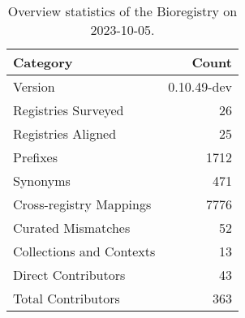 \begin{table}
\caption{Overview statistics of the Bioregistry on 2023-10-05.}
\label{tab:bioregistry-summary}
\begin{tabular}{lr}
\toprule
Category & Count \\
\midrule
Version & 0.10.49-dev \\
Registries Surveyed & 26 \\
Registries Aligned & 25 \\
Prefixes & 1712 \\
Synonyms & 471 \\
Cross-registry Mappings & 7776 \\
Curated Mismatches & 52 \\
Collections and Contexts & 13 \\
Direct Contributors & 43 \\
Total Contributors & 363 \\
\bottomrule
\end{tabular}
\end{table}
